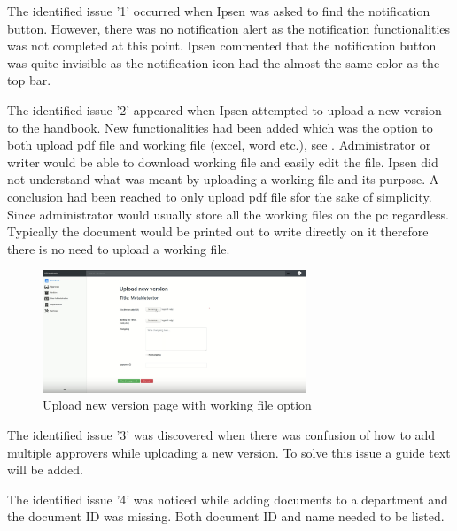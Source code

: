 The identified issue '1' occurred when Ipsen was asked to find the notification button. 
However, there was no notification alert as the notification functionalities was not completed at this point.
Ipsen commented that the notification button was quite invisible as the notification icon had the almost the same color as the top bar.

The identified issue '2' appeared when Ipsen attempted to upload a new version to the handbook.
New functionalities had been added which was the option to both upload pdf file and working file (excel, word etc.), see .
Administrator or writer would be able to download working file and easily edit the file.
Ipsen did not understand what was meant by uploading a working file and its purpose.
A conclusion had been reached to only upload pdf file sfor the sake of simplicity.
Since administrator would usually store all the working files on the pc regardless.
Typically the document would be printed out to write directly on it therefore there is no need to upload a working file.

\begin{figure}[H]
	\centering
		\includegraphics[width=0.7\textwidth]{billeder/WorkingFile.png}
	\caption{Upload new version page with working file option}\label{fig:WorkingFile}
\end{figure}

The identified issue '3' was discovered when there was confusion of how to add multiple approvers while uploading a new version.
To solve this issue a guide text will be added.

The identified issue '4' was noticed while adding documents to a department and the document ID was missing.
Both document ID and name needed to be listed.

